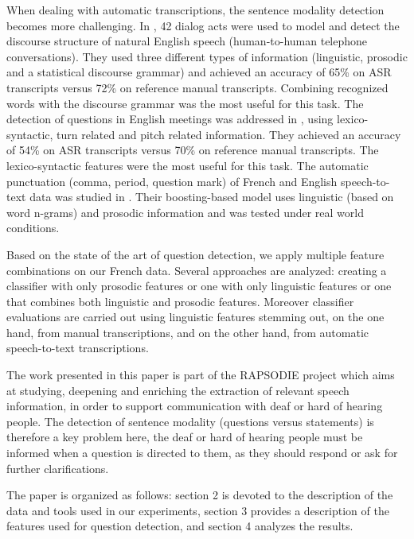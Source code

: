 \documentclass[runningheads,a4paper]{llncs}
\begin{document}
When dealing with automatic transcriptions, the sentence modality detection becomes more challenging.
In \cite{Jurafsky:1997}, 42 dialog acts were used to model and detect the discourse structure of natural English speech (human-to-human telephone conversations). They used three different types of information (linguistic, prosodic and a statistical discourse grammar) and achieved an accuracy of 65\% on ASR transcripts versus 72\% on reference manual transcripts. Combining recognized words with the discourse grammar was the most useful for this task.
The detection of questions in English meetings was addressed in \cite{Boakye:2009}, using lexico-syntactic, turn related and pitch related information. They achieved an accuracy of 54\% on ASR transcripts versus 70\% on reference manual transcripts. The lexico-syntactic features were the most useful for this task.
The automatic punctuation (comma, period, question mark) of French and English speech-to-text data was studied in \cite{Kolar:2012}. Their boosting-based model uses linguistic (based on word n-grams) and prosodic information and was tested under real world conditions.

Based on the state of the art of question detection, we apply multiple feature combinations on our French data.
Several approaches are analyzed: creating a classifier with only prosodic features or one with only linguistic features or one that combines both linguistic and prosodic
features. Moreover classifier evaluations are carried out using linguistic features stemming out, on the one hand, from manual transcriptions, and on the other hand, from automatic speech-to-text transcriptions.

The work presented in this paper is part of the RAPSODIE project which aims at studying, deepening and enriching the extraction of relevant speech information, in order to support communication with deaf or hard of hearing people.
The detection of sentence modality (questions versus statements) is therefore a key problem here, the deaf or hard of hearing people must be informed when a question
is directed to them, as they should respond or ask for further clarifications.

The paper is organized as follows: section 2 is devoted to the description of the data and tools used in our experiments, section 3 provides a description of the features used for question detection, and section 4 analyzes the results.

\end{document}
